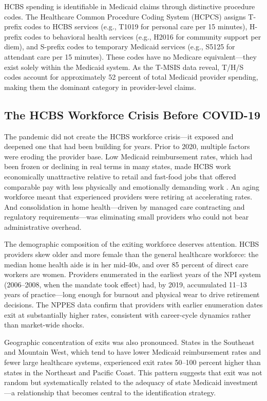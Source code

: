 \documentclass[12pt]{article}
\begin{document}
HCBS spending is identifiable in Medicaid claims through distinctive procedure codes. The Healthcare Common Procedure Coding System (HCPCS) assigns T-prefix codes to HCBS services (e.g., T1019 for personal care per 15 minutes), H-prefix codes to behavioral health services (e.g., H2016 for community support per diem), and S-prefix codes to temporary Medicaid services (e.g., S5125 for attendant care per 15 minutes). These codes have no Medicare equivalent---they exist solely within the Medicaid system. As the T-MSIS data reveal, T/H/S codes account for approximately 52 percent of total Medicaid provider spending, making them the dominant category in provider-level claims.

\subsection{The HCBS Workforce Crisis Before COVID-19}

The pandemic did not create the HCBS workforce crisis---it exposed and deepened one that had been building for years. Prior to 2020, multiple factors were eroding the provider base. Low Medicaid reimbursement rates, which had been frozen or declining in real terms in many states, made HCBS work economically unattractive relative to retail and fast-food jobs that offered comparable pay with less physically and emotionally demanding work \citep{scales2020hcbs}. An aging workforce meant that experienced providers were retiring at accelerating rates. And consolidation in home health---driven by managed care contracting and regulatory requirements---was eliminating small providers who could not bear administrative overhead.

The demographic composition of the exiting workforce deserves attention. HCBS providers skew older and more female than the general healthcare workforce: the median home health aide is in her mid-40s, and over 85 percent of direct care workers are women. Providers enumerated in the earliest years of the NPI system (2006--2008, when the mandate took effect) had, by 2019, accumulated 11--13 years of practice---long enough for burnout and physical wear to drive retirement decisions. The NPPES data confirm that providers with earlier enumeration dates exit at substantially higher rates, consistent with career-cycle dynamics rather than market-wide shocks.

Geographic concentration of exits was also pronounced. States in the Southeast and Mountain West, which tend to have lower Medicaid reimbursement rates and fewer large healthcare systems, experienced exit rates 50--100 percent higher than states in the Northeast and Pacific Coast. This pattern suggests that exit was not random but systematically related to the adequacy of state Medicaid investment---a relationship that becomes central to the identification strategy.
\end{document}
